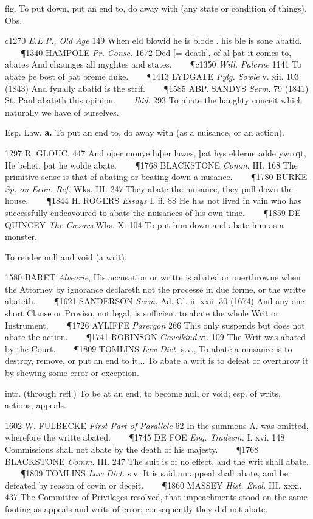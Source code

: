 \begin{description}[wide, labelwidth=!, labelindent=0pt]
\begin{myenumerate}
 fig. To put down, put an end to, do away with (any state or 
condition of things). Obs. 

c1270 \textit{E.E.P., Old Age} 149 When eld blowid he is blode . his ble is 
sone abatid.    
\P 1340 HAMPOLE \textit{Pr. Consc.} 1672 Ded [= death], of al þat it comes to, 
abates And chaunges all myghtes and states.    
\P c1350 \textit{Will. Palerne} 1141 To abate þe bost of þat breme duke.    
\P 1413 LYDGATE \textit{Pylg. Sowle} v. xii. 103 (1843) And fynally abatid is 
the strif.    
\P 1585 ABP. SANDYS \textit{Serm}. 79 (1841) St. Paul abateth this opinion.    
\textit{Ibid}. 293 To abate the haughty conceit which naturally we have of 
ourselves.

 Esp. Law. \textbf{a.} To put an end to, do away with (as a nuisance, 
or an action). 

1297 R. GLOUC. 447 And oþer monye luþer lawes, þat hys elderne adde ywroȝt, He 
behet, þat he wolde abate.    
\P 1768 BLACKSTONE \textit{Comm}. III. 168 The primitive sense is that of 
abating or beating down a nusance.    
\P 1780 BURKE \textit{Sp. on Econ. Ref.} Wks. III. 247 They abate the nuisance, 
they pull down the house.    
\P 1844 H. ROGERS \textit{Essays} I. ii. 88 He has not lived in vain who has 
successfully endeavoured to abate the nuisances of his own time.    
\P 1859 DE QUINCEY \textit{The Cæsars} Wks. X. 104 To put him down and abate 
him as a monster.

 To render null and void (a writ). 

1580 BARET \textit{Alvearie}, His accusation or writte is abated or 
ouerthrowne when the Attorney by ignorance declareth not the processe in due 
forme, or the writte abateth.    
\P 1621 SANDERSON \textit{Serm.} Ad. Cl. ii. xxii. 30 (1674) And any one 
short Clause or Proviso, not legal, is sufficient to abate the whole Writ 
or Instrument.    
\P 1726 AYLIFFE \textit{Parergon} 266 This only suspends but does not 
abate the action.    
\P 1741 ROBINSON \textit{Gavelkind} vi. 109 The Writ was abated by the Court.    
\P 1809 TOMLINS \textit{Law Dict.} s.v., To abate a nuisance is to destroy, 
remove, or put an end to it.‥ To abate a writ is to defeat or overthrow it 
by shewing some error or exception.

 intr. (through refl.) To be at an end, to become null or void; 
esp. of writs, actions, appeals. 

1602 W. FULBECKE \textit{First Part of Parallele} 62 In the summons A. 
was omitted, wherefore the writte abated.    
\P 1745 DE FOE \textit{Eng. Tradesm.} I. xvi. 148 Commissions shall not 
abate by the death of his majesty.    
\P 1768 BLACKSTONE \textit{Comm.} III. 247 The suit is of no effect, and 
the writ shall abate.    
\P 1809 TOMLINS \textit{Law Dict.} s.v. It is said an appeal shall abate, 
and be defeated by reason of covin or deceit.    
\P 1860 MASSEY \textit{Hist. Engl.} III. xxxi. 437 The Committee of 
Privileges resolved, that impeachments stood on the same footing as 
appeals and writs of error; consequently they did not abate.


\end{myenumerate}
\end{description}
